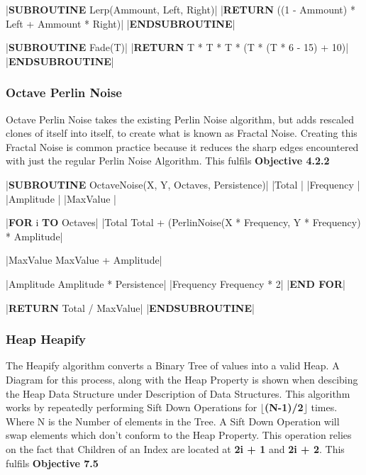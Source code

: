 \begin{flushleft}
\begin{pseudocode}
|\textbf{SUBROUTINE} Lerp(Ammount, Left, Right)|
    |\textbf{RETURN} ((1 - Ammount) * Left + Ammount * Right)|
|\textbf{ENDSUBROUTINE}|

|\textbf{SUBROUTINE} Fade(T)|
    |\textbf{RETURN} T * T * T * (T * (T * 6 - 15) + 10)|
|\textbf{ENDSUBROUTINE}|
                \end{pseudocode}

                \vspace{0.5cm}
            \subsubsection{Octave Perlin Noise}
                Octave Perlin Noise takes the existing Perlin Noise algorithm, but adds rescaled clones of itself into itself, to create
                what is known as Fractal Noise. Creating this Fractal Noise is common practice because it reduces the sharp edges encountered
                with just the regular Perlin Noise Algorithm. This fulfils \textbf{Objective 4.2.2}

                \vspace{0.2cm}
                \begin{pseudocode}
|\textbf{SUBROUTINE} OctaveNoise(X, Y, Octaves, Persistence)|
    |Total |
    |Frequency |
    |Amplitude |
    |MaxValue |

    |\textbf{FOR} i  \textbf{TO} Octaves|
        |Total \leftarrow Total + (PerlinNoise(X * Frequency, Y * Frequency) * Amplitude|

        |MaxValue \leftarrow MaxValue + Amplitude|

        |Amplitude \leftarrow Amplitude * Persistence|
        |Frequency \leftarrow Frequency * 2|
    |\textbf{END FOR}|

    |\textbf{RETURN} Total / MaxValue|
|\textbf{ENDSUBROUTINE}|            
                \end{pseudocode}
            \subsubsection{Heap Heapify}
                The Heapify algorithm converts a Binary Tree of values into a valid Heap. A Diagram for this process, along with the Heap Property is shown when descibing the Heap 
                Data Structure under Description of Data Structures. This algorithm works by repeatedly performing Sift Down Operations for \textbf{$\lfloor$(N-1)/2$\rfloor$} times.
                Where N is the Number of elements in the Tree. A Sift Down Operation will swap elements which don't conform to the Heap Property.
                This operation relies on the fact that Children of an Index are located at \textbf{2i + 1} and \textbf{2i + 2}. This fulfils \textbf{Objective 7.5}
                \vspace{0.2cm}


\end{flushleft}
